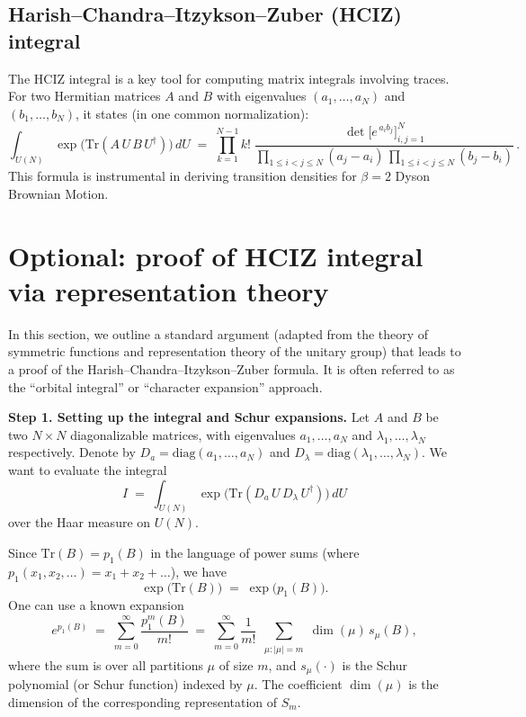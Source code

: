 \documentclass[letterpaper,11pt,oneside,reqno]{book}
\numberwithin{equation}{chapter}  %
\theoremstyle{definition}
\begin{document}
\subsection{Harish--Chandra--Itzykson--Zuber (HCIZ) integral}
The HCIZ integral is a key tool for computing matrix integrals involving traces.
For two Hermitian matrices \(A\) and \(B\) with eigenvalues
\((a_1,\dots,a_N)\) and \((b_1,\dots,b_N)\), it states (in one common
normalization):
\[
\int_{U(N)} \exp\bigl(\mathrm{Tr}(A\,U\,B\,U^\dagger)\bigr)\,dU
\;=\;
\prod_{k=1}^{N-1} k!\;
\frac{\det\bigl[e^{\,a_i b_j}\bigr]_{i,j=1}^N}{
\prod_{1\le i<j\le N}(a_j-a_i)\,\prod_{1\le i<j\le N}(b_j-b_i)}\,.
\]
This formula is instrumental in deriving transition densities for
\(\beta=2\) Dyson Brownian Motion.

\section{Optional: proof of HCIZ integral via representation theory}


In this section, we outline a standard argument (adapted from the theory of symmetric functions and representation theory of the unitary group) that leads to a proof of the Harish--Chandra--Itzykson--Zuber formula.  It is often referred to as the ``orbital integral'' or ``character expansion'' approach.

\smallskip

\noindent
\textbf{Step 1. Setting up the integral and Schur expansions.}
Let \(A\) and \(B\) be two \(N\times N\) diagonalizable matrices, with eigenvalues \(a_1,\ldots,a_N\) and \(\lambda_1,\ldots,\lambda_N\) respectively.  Denote by \(D_a = \mathrm{diag}(a_1,\ldots,a_N)\) and \(D_\lambda = \mathrm{diag}(\lambda_1,\ldots,\lambda_N)\).  We want to evaluate the integral
\[
I \;=\; \int_{U(N)} \exp\bigl(\mathrm{Tr}(D_a\,U\,D_\lambda\,U^\dagger)\bigr)\,dU
\]
over the Haar measure on \(U(N)\).

Since \(\mathrm{Tr}(B) = p_1(B)\) in the language of power sums
(where \(p_1(x_1,x_2,\dots) = x_1 + x_2 + \dots\)),
we have
\[
\exp\bigl(\mathrm{Tr}(B)\bigr) \;=\; \exp\bigl(p_1(B)\bigr).
\]
One can use a known expansion
\cite{Macdonald1995}
\[
e^{p_1(B)} \;=\;
\sum_{m=0}^{\infty} \frac{p_1^m(B)}{m!}
\;=\;
\sum_{m=0}^\infty \frac{1}{m!}\,
\sum_{\substack{\mu: |\mu|=m}}
\dim(\mu)\,s_\mu(B),
\]
where the sum is over all partitions \(\mu\) of size \(m\),
and \(s_\mu(\cdot)\) is the Schur polynomial (or Schur function) indexed by \(\mu\).  The coefficient \(\dim(\mu)\) is the dimension of the corresponding representation of \(S_m\).
\end{document}
